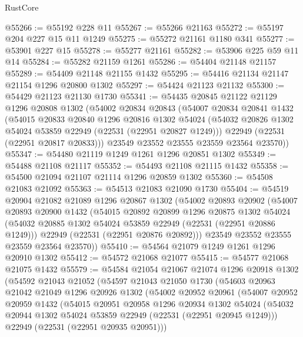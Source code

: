 \begin{lexlean}{RustCore}
\begin{coremodule}
@55266 := @55192 @228 @11
@55267 := @55266 @21163
@55272 := @55197 @204 @227 @15 @11 @1249
@55275 := @55272 @21161 @1180 @341
@55277 := @53901 @227 @15
@55278 := @55277 @21161
@55282 := @53906 @225 @59 @11 @14
@55284 := @55282 @21159 @1261
@55286 := @54404 @21148 @21157
@55289 := @54409 @21148 @21155 @1432
@55295 := @54416 @21134 @21147 @21154 @1296 @20800 @1302
@55297 := @54424 @21123 @21132
@55300 := @54429 @21123 @21130 @1730
@55341 := @54435
    @20845
    @21122
    @21129
    @1296
    @20808
    @1302
    (@54002
      @20834
      @20843
      (@54007
        @20834
        @20841
        @1432
        (@54015
          @20833
          @20840
          @1296
          @20816
          @1302
          @54024
          (@54032 @20826 @1302 @54024 @53859 @22949 (@22531 (@22951 @20827 @1249)))
          @22949
          (@22531 (@22951 @20817 @20833)))
        @23549
        @23552
        @23555
        @23559
        @23564
        @23570))
@55347 := @54480 @21119 @1249 @1261 @1296 @20851 @1302
@55349 := @54488 @21108 @21117
@55352 := @54493 @21108 @21115 @1432
@55358 := @54500 @21094 @21107 @21114 @1296 @20859 @1302
@55360 := @54508 @21083 @21092
@55363 := @54513 @21083 @21090 @1730
@55404 := @54519
    @20904
    @21082
    @21089
    @1296
    @20867
    @1302
    (@54002
      @20893
      @20902
      (@54007
        @20893
        @20900
        @1432
        (@54015
          @20892
          @20899
          @1296
          @20875
          @1302
          @54024
          (@54032 @20885 @1302 @54024 @53859 @22949 (@22531 (@22951 @20886 @1249)))
          @22949
          (@22531 (@22951 @20876 @20892)))
        @23549
        @23552
        @23555
        @23559
        @23564
        @23570))
@55410 := @54564 @21079 @1249 @1261 @1296 @20910 @1302
@55412 := @54572 @21068 @21077
@55415 := @54577 @21068 @21075 @1432
@55579 := @54584
    @21054
    @21067
    @21074
    @1296
    @20918
    @1302
    (@54592
      @21043
      @21052
      (@54597
        @21043
        @21050
        @1730
        (@54603
          @20963
          @21042
          @21049
          @1296
          @20926
          @1302
          (@54002
            @20952
            @20961
            (@54007
              @20952
              @20959
              @1432
              (@54015
                @20951
                @20958
                @1296
                @20934
                @1302
                @54024
                (@54032 @20944 @1302 @54024 @53859 @22949 (@22531 (@22951 @20945 @1249)))
                @22949
                (@22531 (@22951 @20935 @20951)))

\end{coremodule}
\end{lexlean}
